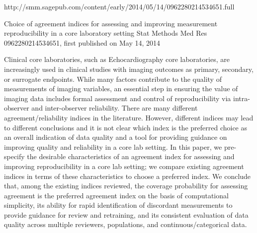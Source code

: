 http://smm.sagepub.com/content/early/2014/05/14/0962280214534651.full

Choice of agreement indices for assessing and improving measurement reproducibility in a core laboratory setting
Stat Methods Med Res 0962280214534651, first published on May 14, 2014

Clinical core laboratories, such as Echocardiography core laboratories, are increasingly used in clinical studies with imaging outcomes as primary, secondary, or surrogate endpoints. While many factors contribute to the quality of measurements of imaging variables, an essential step in ensuring the value of imaging data includes formal assessment and control of reproducibility via intra-observer and inter-observer reliability. There are many different agreement/reliability indices in the literature. However, different indices may lead to different conclusions and it is not clear which index is the preferred choice as an overall indication of data quality and a tool for providing guidance on improving quality and reliability in a core lab setting. In this paper, we pre-specify the desirable characteristics of an agreement index for assessing and improving reproducibility in a core lab setting; we compare existing agreement indices in terms of these characteristics to choose a preferred index. We conclude that, among the existing indices reviewed, the coverage probability for assessing agreement is the preferred agreement index on the basis of computational simplicity, its ability for rapid identification of discordant measurements to provide guidance for review and retraining, and its consistent evaluation of data quality across multiple reviewers, populations, and continuous/categorical data.


